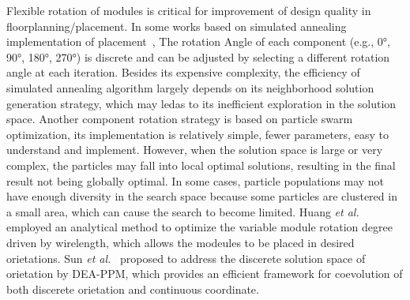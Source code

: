 





Flexible rotation of modules is critical for improvement of design quality in floorplanning/placement. In some works based on simulated annealing implementation of placement~\cite{sheng2012simulated}, The rotation Angle of each component (e.g., 0°, 90°, 180°, 270°) is discrete and can be adjusted by selecting a different rotation angle at each iteration. Besides its expensive complexity, the efficiency of simulated annealing algorithm largely depends on its neighborhood solution generation strategy, which may ledas to its inefficient exploration in the solution space. Another component rotation strategy is based on particle swarm optimization\cite{sun2006floorplanning,kumar2020review}, its implementation is relatively simple, fewer parameters, easy to understand and implement. However, when the solution space is large or very complex, the particles may fall into local optimal solutions, resulting in the final result not being globally optimal. In some cases, particle populations may not have enough diversity in the search space because some particles are clustered in a small area, which can cause the search to become limited.
Huang \emph{et al.}~\cite{Huang2023} employed an analytical method to optimize the variable module rotation degree driven by wirelength, which allows the modeules to be placed in desired orietations.  Sun \emph{et al.}~\cite{main_ref} proposed to address the discerete solution space of orietation by DEA-PPM, which provides an efficient framework for coevolution of both discerete orietation and continuous coordinate.

